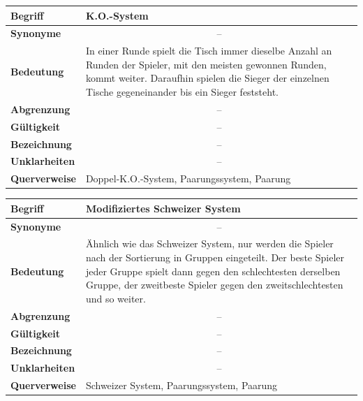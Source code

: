\documentclass[11pt]{article}
\begin{document}
\begin{tabularx}{\textwidth}{| p{} | p{} |}
	\hline
	\textbf{Begriff} & K.O.-System\\ 
	\hline
	\textbf{Synonyme} & \multicolumn{1}{c|}{--}\\
	\hline 
	\textbf{Bedeutung} & In einer Runde spielt die Tisch immer dieselbe Anzahl an Runden der Spieler, mit den meisten gewonnen Runden, kommt weiter. Daraufhin spielen die Sieger der einzelnen Tische gegeneinander bis ein Sieger feststeht.\\
	\hline
	\textbf{Abgrenzung} & \multicolumn{1}{c|}{--}\\
	\hline
	\textbf{Gültigkeit} & \multicolumn{1}{c|}{--}\\
	\hline
	\textbf{Bezeichnung} & \multicolumn{1}{c|}{--}\\
	\hline
	\textbf{Unklarheiten} & \multicolumn{1}{c|}{--} \\
	\hline
	\textbf{Querverweise} & Doppel-K.O.-System, Paarungssystem, Paarung\\
	\hline
\end{tabularx}

\begin{tabularx}{\textwidth}{| p{} | p{} |}
	\hline
	\textbf{Begriff} & Modifiziertes Schweizer System\\ 
	\hline
	\textbf{Synonyme} & \multicolumn{1}{c|}{--}\\
	\hline 
	\textbf{Bedeutung} & Ähnlich wie das Schweizer System, nur werden die Spieler nach der Sortierung in Gruppen eingeteilt. Der beste Spieler jeder Gruppe spielt dann gegen den schlechtesten derselben Gruppe, der zweitbeste Spieler gegen den zweitschlechtesten und so weiter.\\
	\hline
	\textbf{Abgrenzung} & \multicolumn{1}{c|}{--}\\
	\hline
	\textbf{Gültigkeit} & \multicolumn{1}{c|}{--}\\
	\hline
	\textbf{Bezeichnung} & \multicolumn{1}{c|}{--}\\
	\hline
	\textbf{Unklarheiten} & \multicolumn{1}{c|}{--} \\
	\hline
	\textbf{Querverweise} & Schweizer System, Paarungssystem, Paarung\\
	\hline
\end{tabularx}

\newpage
	
\end{document}
